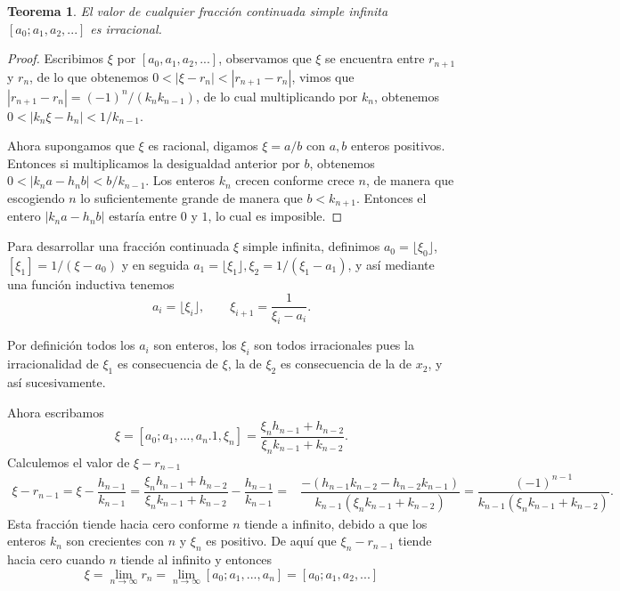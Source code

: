 \documentclass[11pt, article]{article}
\newtheorem{theorem}{Teorema} %
\begin{document}
    \begin{theorem}
        El valor de cualquier fracción continuada simple infinita $[a_0;a_1,a_2,...]$ es irracional.
    \end{theorem} 
    
    \begin{proof}
       Escribimos $\xi$ por $[a_0,a_1, a_2, ...]$, observamos que $\xi$ se encuentra entre $r_{n+1}$ y $r_n$, de lo que obtenemos $0<|\xi - r_n|<|r_{n+1}-r_n|$, vimos que $|r_{n+1}-r_n|=(-1)^n/(k_nk_{n-1})$, de lo cual multiplicando por $k_n$, obtenemos $0<|k_n\xi-h_n|<1/k_{n-1}$.
       
       Ahora supongamos que $\xi$ es racional, digamos $\xi=a/b$ con $a,b$ enteros positivos. Entonces si multiplicamos la desigualdad anterior por $b$, obtenemos $0<|k_na-h_nb|<b/k_{n-1}$.
       Los enteros $k_n$ crecen conforme crece $n$, de manera que escogiendo $n$ lo suficientemente grande de manera que $b<k_{n+1}$. Entonces el entero $|k_na-h_nb|$ estaría entre $0$ y $1$, lo cual es imposible.
    \end{proof}
        
    Para desarrollar una fracción continuada $\xi$ simple infinita, definimos $a_0=\lfloor \xi_0 \rfloor$, $[\xi_1]=1/(\xi-a_0)$ y en seguida $a_1= \lfloor \xi_1 \rfloor, \xi_2=1/(\xi_1-a_1)$, y así mediante una función inductiva tenemos
        \begin{equation}
        a_i=\lfloor \xi_i \rfloor, \qquad \xi_{i+1}=\dfrac{1}{\xi_i-a_i}.
        \label{ecuacion_1}
        \end{equation}

    Por definición todos los $a_i$ son enteros, los $\xi_i$ son todos irracionales pues la irracionalidad de $\xi_1$ es consecuencia de $\xi$, la de $\xi_2$ es consecuencia de la de $x_2$, y así sucesivamente. 
    
    Ahora escribamos 
    \[ 
    \xi=[a_0;a_1,...,a_n.1,\xi_n]=\dfrac{\xi_nh_{n-1}+h_{n-2}}{\xi_nk_{n-1}+k_{n-2}}.
    \]
    Calculemos el valor de $\xi-r_{n-1}$
    \begin{align*}
        \xi-r_{n-1}=\xi-\dfrac{h_{n-1}}{k_{n-1}}=\dfrac{\xi_nh_{n-1}+h_{n-2}}{\xi_nk_{n-1}+k_{n-2}}-\dfrac{h_{n-1}}{k_{n-1}} =& \dfrac{-(h_{n-1}k_{n-2}-h_{n-2}k_{n-1})}{k_{n-1}(\xi_nk_{n-1}+k_{n-2})}=\dfrac{(-1)^{n-1}}{k_{n-1}(\xi_nk_{n-1}+k_{n-2})}.
    \end{align*}
    Esta fracción tiende hacia cero conforme $n$ tiende a infinito, debido a que los enteros $k_n$ son crecientes con $n$ y $\xi_n$ es positivo. De aquí que $\xi_n-r_{n-1}$ tiende hacia cero cuando $n$ tiende al infinito y entonces
        \[
        \xi=\lim_{n\to\infty} r_n=\lim_{n\to\infty}[a_0;a_1,...,a_n]=[a_0;a_1,a_2,...]
        \]
        
\end{document}
